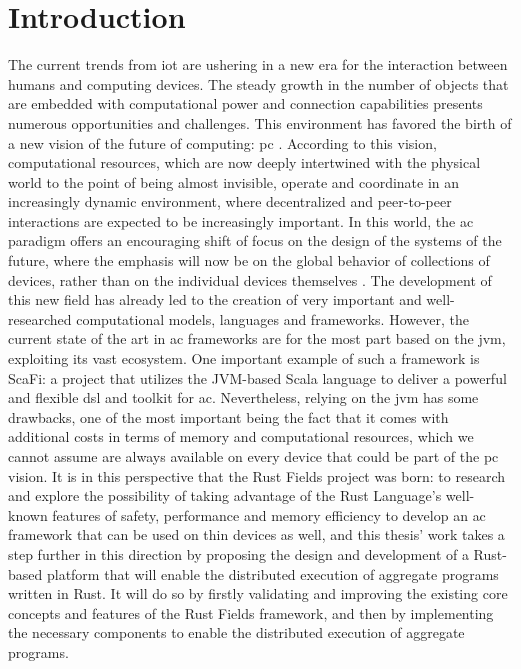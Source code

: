 
\chapter{Introduction}
\label{chap:introduction}
The current trends from \ac{iot} are ushering in a new era for the interaction between humans and computing devices. The steady growth in the number of objects that are embedded with computational power
and connection capabilities presents numerous opportunities and challenges. This environment has favored the birth of a new vision of the future of computing: \ac{pc} \cite{satyanarayanan2001pervasive}.
According to this vision, computational resources, which are now deeply intertwined with the physical world to the point of being almost invisible, operate and coordinate in an increasingly
dynamic environment, where decentralized and peer-to-peer interactions are expected to be increasingly important. In this world, the \ac{ac} paradigm offers an encouraging shift of focus on the design
of the systems of the future, where the emphasis will now be on the global behavior of collections of devices, rather than on the individual devices themselves \cite{7274429}.
The development of this new field has already led to the creation of very important and well-researched computational models, languages and frameworks. However, the current state of the art in \ac{ac}
frameworks are for the most part based on the \ac{jvm}, exploiting its vast ecosystem. One important example of such a framework is ScaFi: a project that utilizes the JVM-based Scala language
to deliver a powerful and flexible \ac{dsl} and toolkit for \ac{ac}. Nevertheless, relying on the \ac{jvm} has some drawbacks, one of the most important being the fact that it comes with additional costs in terms
of memory and computational resources, which we cannot assume are always available on every device that could be part of the \ac{pc} vision. It is in this perspective that the Rust Fields project was born: to
research and explore the possibility of taking advantage of the Rust Language's well-known features of safety, performance and memory efficiency to develop an \ac{ac} framework that can be used on thin devices as well,
and this thesis' work takes a step further in this direction by proposing the design and development of a Rust-based platform that will enable the distributed execution of aggregate programs written in Rust.
It will do so by firstly validating and improving the existing core concepts and features of the Rust Fields framework, and then by implementing the necessary components to enable the distributed execution of aggregate programs.

